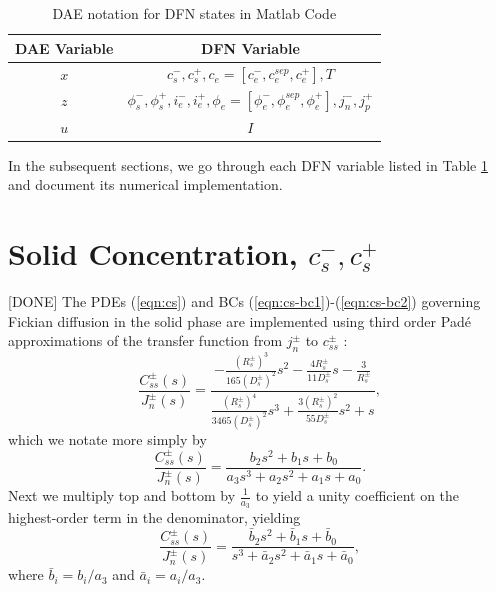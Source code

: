 \documentclass[12pt]{article}
\newcommand{\green}[1]{{\color{green}#1}}
\begin{document}
\begin{table}[h]
\caption{DAE notation for DFN states in Matlab Code}
\begin{center}
\begin{tabular}{c|c}
\hline \hline
\textbf{DAE Variable} & \textbf{DFN Variable} \\
\hline
$x$ & $c_{s}^{-}, c_{s}^{+}, c_{e} = [c_{e}^{-}, c_{e}^{sep}, c_{e}^{+}], T$ \\
$z$ & $\phi_{s}^{-}, \phi_{s}^{+}, i_{e}^{-}, i_{e}^{+}, \phi_{e} = [\phi_{e}^{-}, \phi_{e}^{sep}, \phi_{e}^{+}], j_{n}^{-}, j_{p}^{+}$ \\
$u$ & $I$ \\
\hline \hline
\end{tabular}
\end{center}
\label{tbl:dae-notation}
\end{table}%

In the subsequent sections, we go through each DFN variable listed in Table \ref{tbl:dae-notation} and document its numerical implementation.

\section{Solid Concentration, $c_{s}^{-}, c_{s}^{+}$}\label{sec:cs}
\green{[DONE]} The PDEs (\ref{eqn:cs}) and BCs (\ref{eqn:cs-bc1})-(\ref{eqn:cs-bc2}) governing Fickian diffusion in the solid phase are implemented using third order Pad\'{e} approximations of the transfer function from $j_{n}^{\pm}$ to $c_{ss}^{\pm}$ \cite{Forman2011a,Rahn2012}: 
\begin{equation}
	\frac{C_{ss}^{\pm}(s)}{J_{n}^{\pm}(s)} = \frac{-\frac{(R_{s}^{\pm})^3}{165 (D_{s}^{\pm})^2}s^{2} -\frac{4 R_{s}^{\pm}}{11 D_{s}^{\pm}}s -\frac{3}{R_{s}^{\pm} }  }{ \frac{(R_s^{\pm})^4}{3465 (D_{s}^{\pm})^2}s^3 + \frac{3 (R_s^{\pm})^2}{55 D_s^{\pm}}s^2 + s },
\end{equation}
which we notate more simply by
\begin{equation}
	\frac{C_{ss}^{\pm}(s)}{J_{n}^{\pm}(s)} = \frac{b_2 s^{2} + b_1 s + b_0 }{ a_3 s^3 + a_2 s^2 + a_1 s + a_0 }.
\end{equation}
Next we multiply top and bottom by $\frac{1}{a_3}$ to yield a unity coefficient on the highest-order term in the denominator, yielding
\begin{equation}\label{eqn:cs-tf}
	\frac{C_{ss}^{\pm}(s)}{J_{n}^{\pm}(s)} = \frac{\bar{b}_2 s^{2} + \bar{b}_1 s + \bar{b}_0 }{ s^3 + \bar{a}_2 s^2 + \bar{a}_1 s + \bar{a}_0 },
\end{equation}
where $\bar{b}_i = b_i/a_3$ and $\bar{a}_i = a_i/a_3$.
\end{document}

